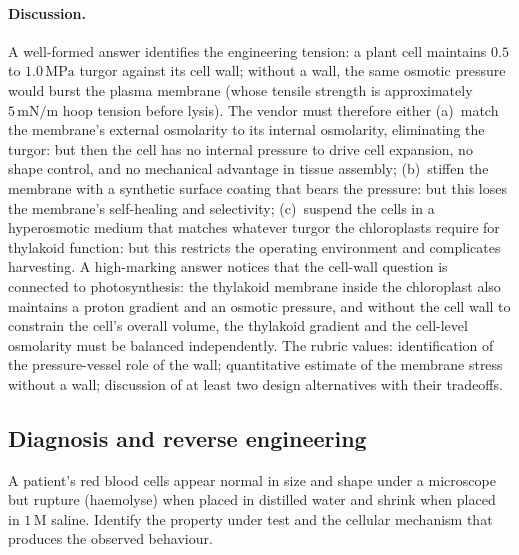 \paragraph{Discussion.}
A well-formed answer identifies the engineering tension: a plant cell
maintains $0.5$ to $1.0\,\text{MPa}$ turgor against its cell wall;
without a wall, the same osmotic pressure would burst the plasma
membrane (whose tensile strength is approximately $5\,\text{mN/m}$
hoop tension before lysis). The vendor must therefore either
(a)~match the membrane's external osmolarity to its internal
osmolarity, eliminating the turgor: but then the cell has no
internal pressure to drive cell expansion, no shape control, and no
mechanical advantage in tissue assembly; (b)~stiffen the membrane
with a synthetic surface coating that bears the pressure: but this
loses the membrane's self-healing and selectivity; (c)~suspend the
cells in a hyperosmotic medium that matches whatever turgor the
chloroplasts require for thylakoid function: but this restricts the
operating environment and complicates harvesting. A high-marking
answer notices that the cell-wall question is connected to
photosynthesis: the thylakoid membrane inside the chloroplast also
maintains a proton gradient and an osmotic pressure, and without
the cell wall to constrain the cell's overall volume, the thylakoid
gradient and the cell-level osmolarity must be balanced independently.
The rubric values: identification of the pressure-vessel role of the
wall; quantitative estimate of the membrane stress without a wall;
discussion of at least two design alternatives with their tradeoffs.

\subsection*{Diagnosis and reverse engineering}

\begin{exercise}
A patient's red blood cells appear normal in size and shape under a
microscope but rupture (haemolyse) when placed in distilled water and
shrink when placed in $1\,\text{M}$ saline. Identify the property
under test and the cellular mechanism that produces the observed
behaviour.
\end{exercise}

